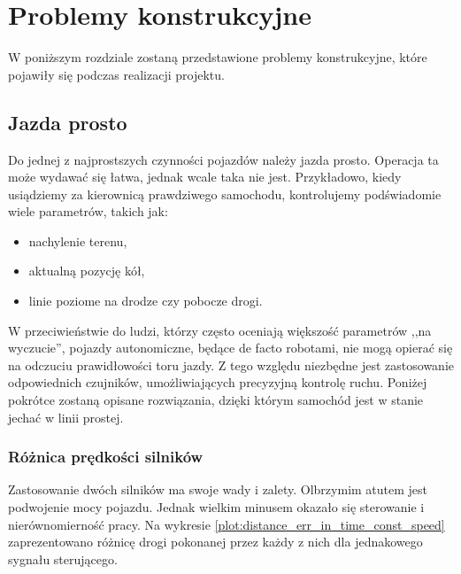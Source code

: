 \section{Problemy konstrukcyjne}
\label{sec:problemy_konstrukcyjne}
    W poniższym rozdziale zostaną przedstawione problemy konstrukcyjne,
    które pojawiły się podczas realizacji projektu.

    \subsection{Jazda prosto}
    \label{section:jazda_prosto}
        Do jednej z najprostszych czynności pojazdów należy jazda prosto.
        Operacja ta może wydawać się łatwa, jednak wcale taka nie jest.
        Przykładowo, kiedy usiądziemy za kierownicą prawdziwego samochodu, kontrolujemy podświadomie wiele parametrów, takich jak:
        \begin{itemize}
            \item nachylenie terenu,
            \item aktualną pozycję kół,
            \item linie poziome na drodze czy pobocze drogi.
        \end{itemize}
        W przeciwieństwie do ludzi, którzy często oceniają większość parametrów ,,na wyczucie'', pojazdy autonomiczne,
        będące de facto robotami, nie mogą opierać się na odczuciu prawidłowości toru jazdy.
        Z tego względu niezbędne jest zastosowanie odpowiednich czujników, umożliwiających precyzyjną kontrolę ruchu.
        Poniżej pokrótce zostaną opisane rozwiązania, dzięki którym samochód jest w stanie jechać w linii prostej.

        \subsubsection{Różnica prędkości silników}
            Zastosowanie dwóch silników ma swoje wady i zalety.
            Olbrzymim atutem jest podwojenie mocy pojazdu.
            Jednak wielkim minusem okazało się sterowanie i nierównomierność pracy.
            Na wykresie \ref{plot:distance_err_in_time_const_speed} zaprezentowano różnicę drogi pokonanej przez każdy z nich dla jednakowego sygnału sterującego.

